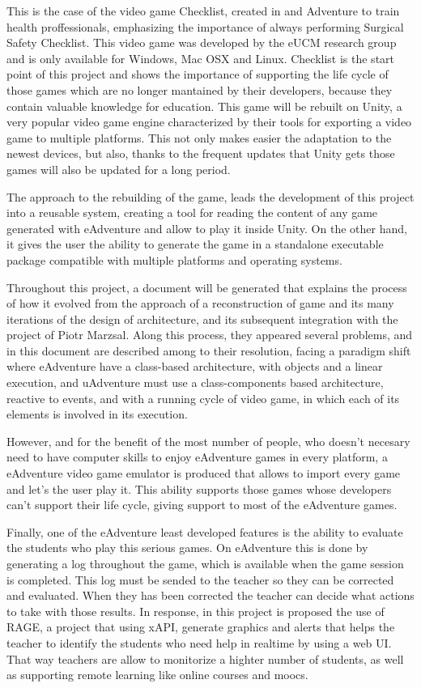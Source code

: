 This is the case of the video game Checklist, created in and Adventure to train health proffessionals, emphasizing the importance of always performing Surgical Safety Checklist. This video game was developed by the eUCM research group and is only available for Windows, Mac OSX and Linux. Checklist is the start point of this project and shows the importance of supporting the life cycle of those games which are no longer mantained by their developers, because they contain valuable knowledge for education. This game will be rebuilt on Unity, a very popular video game engine characterized by their tools for exporting a video game to multiple platforms. This not only makes easier the adaptation to the newest devices, but also, thanks to the frequent updates that Unity gets those games will also be updated for a long period.

The approach to the rebuilding of the game, leads the development of this project into a reusable system, creating a tool for reading the content of any game generated with eAdventure and allow to play it inside Unity. On the other hand, it gives the user the ability to generate the game in a standalone executable package compatible with multiple platforms and operating systems.

Throughout this project, a document will be generated that explains the process of how it evolved from the approach of a reconstruction of game and its many iterations of the design of architecture, and its subsequent integration with the project of Piotr Marzsal. Along this process, they appeared several problems, and in this document are described among to their resolution, facing a paradigm shift where eAdventure have a class-based architecture, with objects and a linear execution, and uAdventure must use a class-components based architecture, reactive to events, and with a running cycle of video game, in which each of its elements is involved in its execution.

However, and for the benefit of the most number of people, who doesn't necesary need to have computer skills to enjoy eAdventure games in every platform, a eAdventure video game emulator is produced that allows to import every game and let's the user play it. This ability supports those games whose developers can't support their life cycle, giving support to most of the eAdventure games. 

Finally, one of the eAdventure least developed features is the ability to evaluate the students who play this serious games. On eAdventure this is done by generating a log throughout the game, which is available when the game session is completed. This log must be sended to the teacher so they can be corrected and evaluated. When they has been corrected the teacher can decide what actions to take with those results. In response, in this project is proposed the use of RAGE, a project that using xAPI, generate graphics and alerts that helps the teacher to identify the students who need help in realtime by using a web UI. That way teachers are allow to monitorize a highter number of students, as well as supporting remote learning like online courses and moocs.


